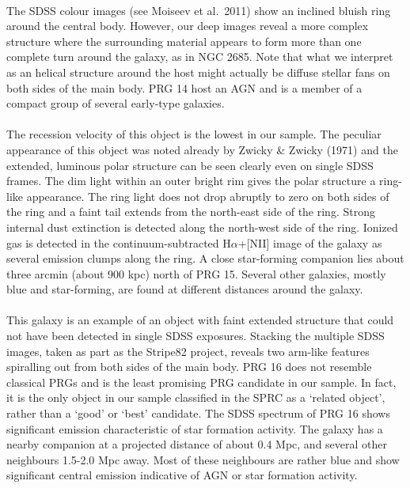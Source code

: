\documentclass[useAMS,usenatbib]{mn2e}
\begin{document}
 \\
The SDSS colour images (see Moiseev et al.\ 2011) show an inclined bluish ring around the central body. However, our deep images reveal a more complex structure where the surrounding material appears to form more than one complete turn around the galaxy, as in NGC 2685. Note that what we interpret as an helical structure around the host might actually be diffuse stellar fans on both sides of the main body. 
PRG 14 host an AGN and is a member of a compact group of several early-type galaxies. \\

 \\
The recession velocity of this object is the lowest in our sample.
The peculiar appearance of this object was noted already by Zwicky \& Zwicky (1971) and the extended, luminous polar structure can be seen clearly even on single SDSS frames.
The dim light within an outer bright rim gives the polar structure a ring-like appearance. The ring light does not drop abruptly to zero on both sides of the ring and a faint tail extends from the north-east side of the ring.
Strong internal dust extinction is detected along the north-west side of the ring.
Ionized gas is detected in the continuum-subtracted H$\alpha$+[NII] image of the galaxy as several emission clumps along the ring. 
A close star-forming companion lies about three arcmin (about 900 kpc) north of PRG 15. Several other galaxies, mostly blue and star-forming, are found at different distances around the galaxy. \\

 \\
This galaxy is an example of an object with faint extended structure that could not have been detected in single SDSS exposures. 
Stacking the multiple SDSS images, taken as part as the Stripe82 project, reveals two arm-like features spiralling out from both sides of the main body. 
PRG 16 does not resemble classical PRGs and is the least promising PRG candidate in our sample. In fact, it is the only object in our sample classified in the SPRC as a `related object', rather than a `good' or `best' candidate.
The SDSS spectrum of PRG 16 shows significant emission characteristic of star formation activity.
The galaxy has a nearby companion at a projected distance of about 0.4 Mpc, and several other neighbours 1.5-2.0 Mpc away.
Most of these neighbours are rather blue and show significant central emission indicative of AGN or star formation activity. \\
\end{document}
